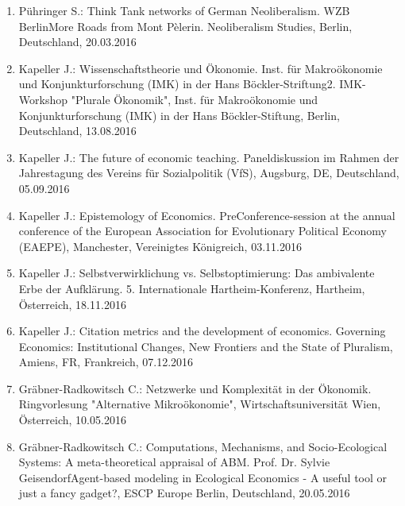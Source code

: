\begin{enumerate}
	\item Pühringer S.: Think Tank networks of German Neoliberalism. WZB BerlinMore Roads from Mont Pèlerin. Neoliberalism Studies, Berlin, Deutschland, 20.03.2016
	\item Kapeller J.: Wissenschaftstheorie und Ökonomie. Inst. für Makroökonomie und  Konjunkturforschung (IMK) in der Hans Böckler-Striftung2. IMK-Workshop "Plurale Ökonomik", Inst. für Makroökonomie und Konjunkturforschung (IMK) in der Hans Böckler-Stiftung, Berlin, Deutschland, 13.08.2016
	\item Kapeller J.: The future of economic teaching. Paneldiskussion im Rahmen der Jahrestagung des Vereins für Sozialpolitik (VfS), Augsburg, DE, Deutschland, 05.09.2016
	\item Kapeller J.: Epistemology of Economics. PreConference-session at the annual conference of the European Association for Evolutionary Political Economy (EAEPE), Manchester, Vereinigtes Königreich, 03.11.2016
	\item Kapeller J.: Selbstverwirklichung vs. Selbstoptimierung: Das ambivalente Erbe der Aufklärung. 5. Internationale Hartheim-Konferenz, Hartheim, Österreich, 18.11.2016
	\item Kapeller J.: Citation metrics and the development of economics. Governing Economics: Institutional Changes, New Frontiers and the State of Pluralism, Amiens, FR, Frankreich, 07.12.2016
	\item Gräbner-Radkowitsch C.: Netzwerke und Komplexität in der Ökonomik. Ringvorlesung "Alternative Mikroökonomie", Wirtschaftsuniversität Wien, Österreich, 10.05.2016
	\item Gräbner-Radkowitsch C.: Computations, Mechanisms, and Socio-Ecological Systems: A meta-theoretical appraisal of ABM. Prof. Dr. Sylvie GeisendorfAgent-based modeling in Ecological Economics - A useful tool or just a fancy gadget?, ESCP Europe Berlin, Deutschland, 20.05.2016
\end{enumerate}

